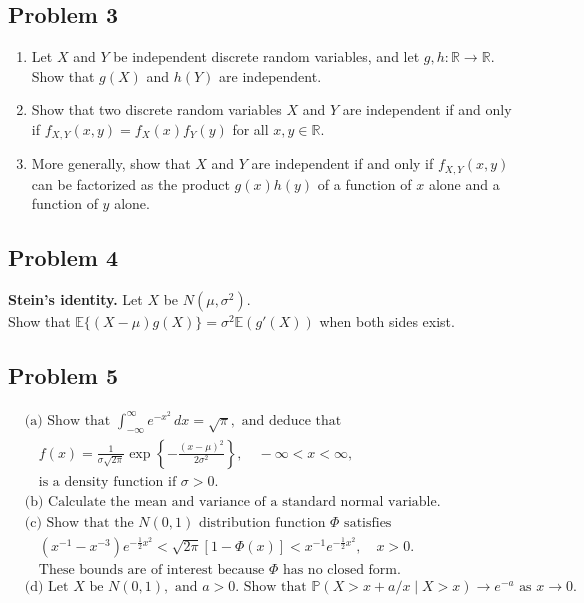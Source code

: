 \documentclass[letterpaper, 11pt]{article}
\newcommand{\1}{\mathds{1}}	%
\theoremstyle{definition}
\begin{document}
    \subsection*{Problem 3}
    \begin{enumerate}
        \item Let $X$ and $Y$ be independent discrete random variables, and let $g, h : \mathbb{R} \rightarrow \mathbb{R}$. Show that $g(X)$ and $h(Y)$ are independent.
        \item Show that two discrete random variables $X$ and $Y$ are independent if and only if $f_{X,Y}(x, y) = f_X(x) f_Y(y)$ for all $x, y \in \mathbb{R}$.
        \item More generally, show that $X$ and $Y$ are independent if and only if $f_{X,Y}(x, y)$ can be factorized as the product $g(x)h(y)$ of a function of $x$ alone and a function of $y$ alone.
    \end{enumerate}
    \subsection*{Problem 4}
 \textbf{Stein's identity.} Let $X$ be $N(\mu, \sigma^2)$. \\
 Show that $\mathbb{E}\{(X - \mu)g(X)\} = \sigma^2\mathbb{E}(g'(X))$ when both sides exist.
 \subsection*{Problem 5}
 \begin{align*}
    &\text{(a) Show that } \int_{-\infty}^{\infty} e^{-x^2} \, dx = \sqrt{\pi}, \text{ and deduce that} \\
    &\quad f(x) = \frac{1}{\sigma\sqrt{2\pi}} \exp\left\{-\frac{(x-\mu)^2}{2\sigma^2}\right\}, \quad -\infty < x < \infty, \\
    &\quad \text{is a density function if } \sigma > 0. \\
    &\text{(b) Calculate the mean and variance of a standard normal variable.} \\
    &\text{(c) Show that the } N(0,1) \text{ distribution function } \Phi \text{ satisfies} \\
    &\quad (x^{-1} - x^{-3})e^{-\frac{1}{2}x^2} < \sqrt{2\pi}[1 - \Phi(x)] < x^{-1}e^{-\frac{1}{2}x^2}, \quad x > 0. \\
    &\quad \text{These bounds are of interest because } \Phi \text{ has no closed form.} \\
    &\text{(d) Let } X \text{ be } N(0,1), \text{ and } a > 0. \text{ Show that } \mathbb{P}(X > x + a/x \mid X > x) \to e^{-a} \text{ as } x \to 0.
    \end{align*}
\end{document}
